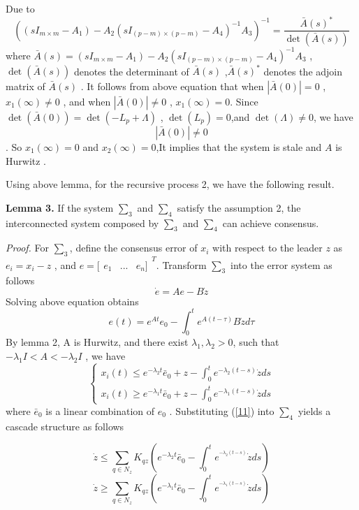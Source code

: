 \documentclass[english]{cccconf}
\begin{document}
{{Due to
\[{((s{I_{m \times m}} - {A_1}) - {A_2}{(s{I_{(p - m) \times (p - m)}} - {A_4})^{ - 1}}{A_3})^{ - 1}} = \frac{{\bar A{{(s)}^*}}}{{\det (\bar A(s))}}\]
where $\bar A(s) = (s{I_{m \times m}} - {A_1}) - {A_2}{(s{I_{(p - m) \times (p - m)}} - {A_4})^{ - 1}}{A_3}$ , $\det (\bar A(s))$ denotes the determinant of $\bar A(s)$ ,$\bar A{(s)^*}$ denotes the adjoin matrix of $\bar A(s)$ .
It follows from above equation that when $\left| {\bar A(0)} \right| = 0$ ,${x_1}(\infty ) \ne 0$
  , and when $\left| {\bar A(0)} \right| \ne 0$ , ${x_1}(\infty ) = 0$.
Since $\det (\bar A(0)) = \det ( - {L_p} + \Lambda )$ , $\det ({L_p}) = 0$,and $\det (\Lambda ) \ne 0$, we have
 \[\left| {\bar A(0)} \right| \ne 0\].
So  ${x_1}(\infty ) = 0$ and ${x_2}(\infty ) = 0$,It implies that  the system is stale
and $A$ is Hurwitz .

Using above lemma, for the recursive process 2, we have the following result.

{\textbf{Lemma 3. }}If the system $\sum_3$  and $\sum_4$  satisfy  the assumption 2, the interconnected system composed by  $\sum_3$  and $\sum_4$    can achieve consensus.

\emph{Proof. } For $\sum_3$, define the consensus error of  $x_i$ with respect to the leader $z$  as ${e_i} = {x_i} - z$ , and $e = [{\begin{array}{*{20}{c}}
{{e_1}}&{...}&{{e_n}]}
\end{array}^T}$. Transform  $\sum_3$ into the error system as follows
\begin{equation}  \label{10}
\dot e = Ae - B\dot z
\end{equation}
Solving above equation obtains
\[e(t) = {e^{At}}{e_0} - \int_0^t {{e^{A(t - \tau )}}B\dot zd\tau } \]
By lemma 2, A is Hurwitz, and  there exist $\lambda _1,\lambda _2>0$,  such that ${-\lambda _1}I < A < -{\lambda _2}I$ ,
we have
\begin{equation}  \label{11}
\left\{ \begin{array}{l}
{x_i}(t) \le {e^{ - {\lambda _2}t}}{{\bar e}_0} + z - \int_0^t {{e^{ - {\lambda _2}(t - s)}}} \dot zds\\
{x_i}(t) \ge {e^{ - {\lambda _1}t}}{{\bar e}_0} + z - \int_0^t {{e^{ - {\lambda _1}(t - s)}}} \dot zds
\end{array} \right.
\end{equation}
where  ${\bar e_0}$ is a linear combination of $e_0$ .
Substituting (\ref{11}) into $\sum_4$ yields a cascade structure as follows

\begin{equation}  \label{12}
\dot z \le \sum\limits_{q \in {N_z}}^{} {{K_{qz}}({e^{ - {\lambda _2}t}}{{\bar e}_0} - \int_0^t {{e^{^{ - {\lambda _2}(t - s)}}}} \dot zds)}
\end{equation}
\begin{equation}  \label{13}
\dot z \ge \sum\limits_{q \in {N_z}}^{} {{K_{qz}}({e^{ - {\lambda _1}t}}{{\bar e}_0} - \int_0^t {{e^{^{ - {\lambda _1}(t - s)}}}} \dot zds)}
\end{equation}

}}
\end{document}
